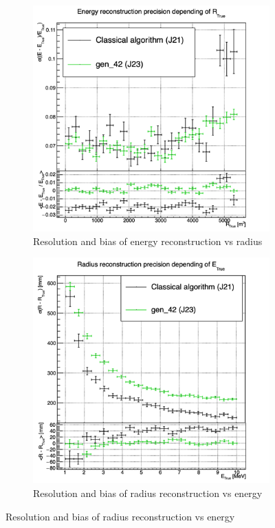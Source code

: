 \documentclass[../main.tex]{subfiles}
\begin{document}
{{\begin{figure}[ht]
\begin{subfigure}[t]{0.32\linewidth}
    \includegraphics[width=\linewidth]{images/jcnn/vic_cnn/multi_vic_42_MESBvRTC.png}
    \caption{Resolution and bias of energy reconstruction vs radius}
    \label{fig:jcnn:vic_cnn:multi_vic_42_MESBvRTC}
  \end{subfigure}
  \begin{subfigure}[t]{0.32\linewidth}
    \centering
    \includegraphics[width=\linewidth]{images/jcnn/vic_cnn/multi_vic_42_MSBvETC.png}
    \caption{Resolution and bias of radius reconstruction vs energy}
    \label{fig:jcnn:vic_cnn:multi_vic_42_MSBvETC}
  \end{subfigure}



\end{figure}}}
\end{document}
